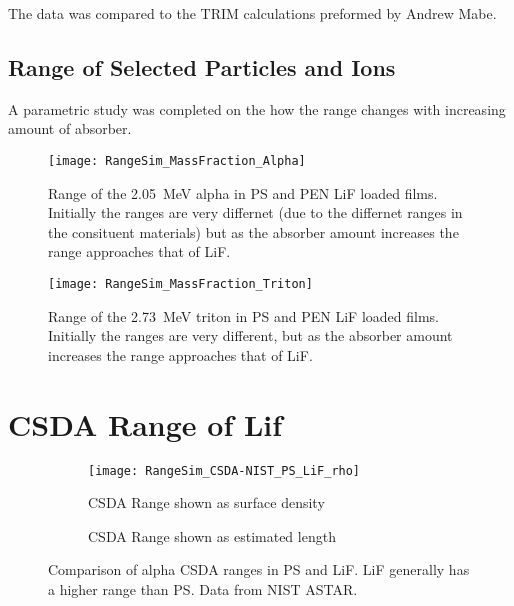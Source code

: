 \documentclass[draftcls,onecolumn]{IEEEtran}
\begin{document}
The data was compared to the TRIM calculations preformed by Andrew Mabe.
\subsection{Range of Selected Particles and Ions}
\label{sec:RangeResults}

A parametric study was completed on the how the range changes with increasing amount of absorber.
\begin{figure}
  \texttt{[image: RangeSim\_MassFraction\_Alpha]}
  \caption[2.05 MeV Alpha Range in PS and PEN Composites]{Range of the \SI{2.05}{\MeV} alpha in PS and PEN LiF loaded films. Initially the ranges are very differnet (due to the differnet ranges in the consituent materials) but as the absorber amount increases the range approaches that of LiF.}
  \label{fig:MassFracRangeAlpha}
\end{figure}
\begin{figure}
  \texttt{[image: RangeSim\_MassFraction\_Triton]}
  \caption[2.78 MeV Triton Range in PS and PEN Composites]{Range of the \SI{2.73}{\MeV} triton in PS and PEN LiF loaded films. Initially the ranges are very different, but as the absorber amount increases the range approaches that of LiF.}
  \label{MassFracRangeTriton}
\end{figure}

\appendices
\section{CSDA Range of Lif}
\label{sec:CSDARangeLiF}
\begin{figure}
  \centering
  \begin{subfigure}{0.45\textwidth}
    \texttt{[image: RangeSim\_CSDA-NIST\_PS\_LiF\_rho]}
    \caption{CSDA Range shown as surface density}
    \label{fig:NISTPSLiF_rho}
  \end{subfigure}%
  \begin{subfigure}
    \texttt{[image: RangeSim\_CSDA-NIST\_PS\_LiF\_um]}
    \caption{CSDA Range shown as estimated length}
    \label{fig:NISTPSLiF_um}
  \end{subfigure}
  \caption[Comparison of alpha ranges in LiF and PS]{Comparison of alpha CSDA ranges in PS and LiF. LiF generally has a higher range than PS. Data from NIST ASTAR\cite{berger_estar_2005}.} 
  \label{fig:NISTPSLiF}
\end{figure}
\end{document}
